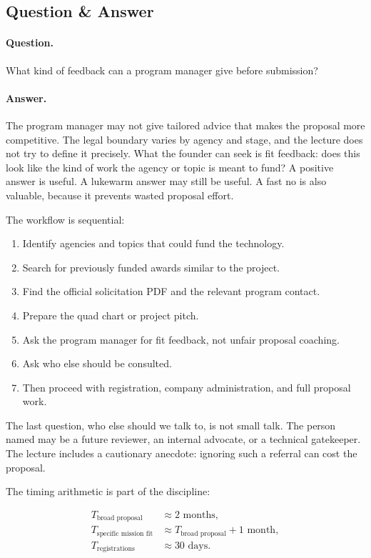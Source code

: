 \subsection{Question \& Answer}

\paragraph{Question.}
What kind of feedback can a program manager give before submission?

\paragraph{Answer.}
The program manager may not give tailored advice that makes the proposal more competitive. The legal boundary varies by agency and stage, and the lecture does not try to define it precisely. What the founder can seek is fit feedback: does this look like the kind of work the agency or topic is meant to fund? A positive answer is useful. A lukewarm answer may still be useful. A fast no is also valuable, because it prevents wasted proposal effort.

The workflow is sequential:

\begin{enumerate}
\item Identify agencies and topics that could fund the technology.
\item Search for previously funded awards similar to the project.
\item Find the official solicitation PDF and the relevant program contact.
\item Prepare the quad chart or project pitch.
\item Ask the program manager for fit feedback, not unfair proposal coaching.
\item Ask who else should be consulted.
\item Then proceed with registration, company administration, and full proposal work.
\end{enumerate}

The last question, who else should we talk to, is not small talk. The person named may be a future reviewer, an internal advocate, or a technical gatekeeper. The lecture includes a cautionary anecdote: ignoring such a referral can cost the proposal.

The timing arithmetic is part of the discipline:

\begin{align}
T_{\text{broad proposal}} &\approx 2\text{ months},\\
T_{\text{specific mission fit}} &\approx T_{\text{broad proposal}}+1\text{ month},\\
T_{\text{registrations}} &\approx 30\text{ days}.
\end{align}

